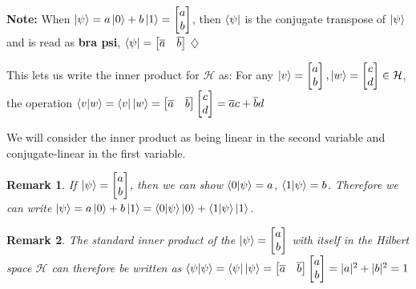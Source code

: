 \documentclass[12pt,twoside,fleqn]{report}
\theoremstyle{thmstyle}
\newtheorem{remark}{Remark}[chapter]
\newenvironment{note}{\textbf{Note:}}{\hfill\ensuremath{\diamondsuit}}
\begin{document}
\begin{note}
    When $\ket{\psi} = a \ket{0} + b \ket{1} = \begin{bmatrix} a \\ b \end{bmatrix}$, then $\bra{\psi}$ is the conjugate transpose of $\ket{\psi}$ and is read as \textbf{bra psi}, $\bra{\psi} = \begin{bmatrix} \overline{a} & \overline{b}\end{bmatrix}$
\end{note}

This lets us write the inner product for $\mathcal{H}$ as:
For any $\ket{v} = \begin{bmatrix} a \\ b \end{bmatrix}, \ket{w} = \begin{bmatrix} c \\ d \end{bmatrix} \in \mathcal{H}$, the operation $\braket{v|w} = \bra{v}\ket{w} = \begin{bmatrix} \overline{a} & \overline{b} \end{bmatrix} \begin{bmatrix} c \\ d \end{bmatrix} = \overline{a} c + \overline{b} d $

We will consider the inner product as being linear in the second variable and conjugate-linear in the first variable.

\begin{remark}
If $\ket{\psi} = \begin{bmatrix} a \\ b \end{bmatrix}$, then we can show $\braket{0|\psi} = a$, $\braket{1|\psi} = b$.
Therefore we can write $\ket{\psi} = a \ket{0} + b \ket{1} = \braket{0|\psi} \ket{0} + \braket{1|\psi} \ket{1}$.
\end{remark}

\begin{remark}
The standard inner product of the $\ket{\psi} = \begin{bmatrix} a \\ b \end{bmatrix}$ with itself in the Hilbert space $\mathcal{H}$ can therefore be written as $\braket{\psi | \psi} = \bra{\psi}\ket{\psi} = \begin{bmatrix} \overline{a} & \overline{b}\end{bmatrix} \begin{bmatrix} a \\ b \end{bmatrix} = |a|^2 + |b|^2 = 1$
\end{remark}
\end{document}
